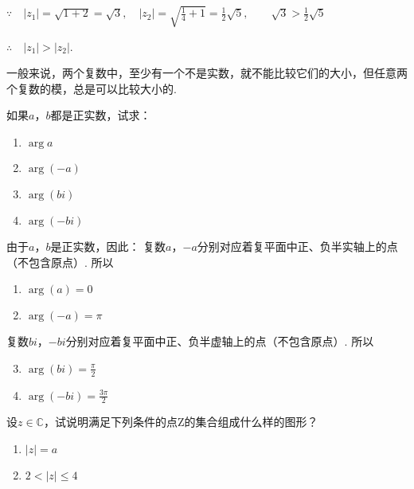 \begin{solution}
$\because\quad |z_1|=\sqrt{1+2}=\sqrt{3},\quad |z_2|=\sqrt{\frac{1}{4}+1}=\frac{1}{2}\sqrt{5},\qquad \sqrt{3}>\frac{1}{2}\sqrt{5}$

$\therefore\quad |z_1|>|z_2|$.
\end{solution}

一般来说，两个复数中，至少有一个不是实数，就不能比较它们的大小，但任意两个复数的模，总是可以比较大小的.

\begin{example}
    如果$a$，$b$都是正实数，试求：
\begin{multicols}{4}
\begin{enumerate}[(1)]
    \item $\arg a$
    \item $\arg (-a)$
    \item $\arg (bi)$
    \item $\arg (-bi)$
\end{enumerate}
\end{multicols}
\end{example}

\begin{solution}
由于$a$，$b$是正实数，因此：
复数$a$，$-a$分别对应着复平面中正、负半实轴上的点（不包含原点）. 所以
\begin{multicols}{2}
    \begin{enumerate}[(1)]
        \item $\arg (a)=0$
        \item $\arg (-a)=\pi$
    \end{enumerate}
    \end{multicols}
复数$bi$，$-bi$分别对应着复平面中正、负半虚轴上的点（不包含原点）. 所以
\begin{multicols}{2}
    \begin{enumerate}[(1)]\setcounter{enumi}{2}
        \item $\arg (bi)=\frac{\pi}{2}$
        \item $\arg (-bi)=\frac{3\pi}{2}$
    \end{enumerate}
    \end{multicols}
\end{solution}

\begin{example}
    设$z\in\mathbb{C}$，试说明满足下列条件的点Z的集合组成什么样的图形？
\begin{multicols}{2}
\begin{enumerate}[(1)]
    \item $|z|=a$
    \item $2<|z|\le 4$
\end{enumerate}
\end{multicols}
\end{example}

